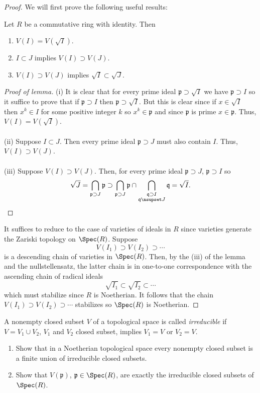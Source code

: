 \begin{proof}
We will first prove the following useful results:
\begin{lemma*}
Let $R$ be a commutative ring with identity. Then
\begin{enumerate}[noitemsep,label=(\roman*)]
\item $V(I)=V(\sqrt{I})$.
\item $I\subset J$ implies $V(I)\supset V(J)$.
\item $V(I)\supset V(J)$ implies $\sqrt{I}\subset\sqrt{J}$.
\end{enumerate}
\end{lemma*}
\begin{proof}[Proof of lemma]
\renewcommand\qedsymbol{$\clubsuit$}
(i) It is clear that for every prime ideal
$\mathfrak{p}\supset\sqrt{I}$ we have $\mathfrak{p}\supset I$ so
it suffice to prove that if $\mathfrak{p}\supset I$ then
$\mathfrak{p}\supset\sqrt{I}$. But this is clear since if
$x\in\sqrt{I}$ then $x^k\in I$ for some positive integer $k$ so
$x^k\in\mathfrak{p}$ and since $\mathfrak{p}$ is prime
$x\in\mathfrak{p}$. Thus, $V(I)=V(\sqrt{I})$.
\\\\
(ii) Suppose $I\subset J$. Then every prime ideal
$\mathfrak{p}\supset J$ must also contain $I$. Thus, $V(I)\supset
V(J)$.
\\\\
(iii) Suppose $V(I)\supset V(J)$. Then, for every prime ideal
$\mathfrak{p}\supset J$, $\mathfrak{p}\supset I$ so
\[
\sqrt{J}=\bigcap_{\mathfrak{p}\supset J}\mathfrak{p}\supset
\bigcap_{\mathfrak{p}\supset
    J}\mathfrak{p}\cap\bigcap_{\substack{\mathfrak{q}\supset
    I\\\mathfrak{q}\nsupset J}}\mathfrak{q}=\sqrt{I}.\qedhere
\]
\end{proof}
It suffices to reduce to the case of varieties of ideals in
$R$ since varieties generate the Zariski topology on
$\Spec(R)$. Suppose
\[
V(I_1)\supset V(I_2)\supset\cdots
\]
is a descending chain of varieties in $\Spec(R)$. Then, by the (iii)
of the lemma and the nullstellensatz, the latter chain is in
one-to-one correspondence with the ascending chain of radical ideals
\[
\sqrt{I_1}\subset\sqrt{I_2}\subset\cdots
\]
which must stabilize since $R$ is Noetherian. It follows that the
chain $V(I_1)\supset V(I_2)\supset\cdots$ stabilizes so $\Spec(R)$ is
Noetherian.
\end{proof}
\newpage
\begin{problem}
A nonempty closed subset $V$ of a topological space is called
\emph{irreducible} if $V=V_1\cup V_2$, $V_1$ and $V_2$ closed
subset, implies $V_1=V$ or $V_2=V$.
\begin{enumerate}[noitemsep,label=(\alph*)]
\item Show that in a Noetherian topological space every nonempty
  closed subset is a finite union of irreducible closed subsets.
\item Show that $V(\mathfrak{p})$, $\mathfrak{p}\in\Spec(R)$, are
  exactly the irreducible closed subsets of $\Spec(R)$.
\end{enumerate}
\end{problem}
